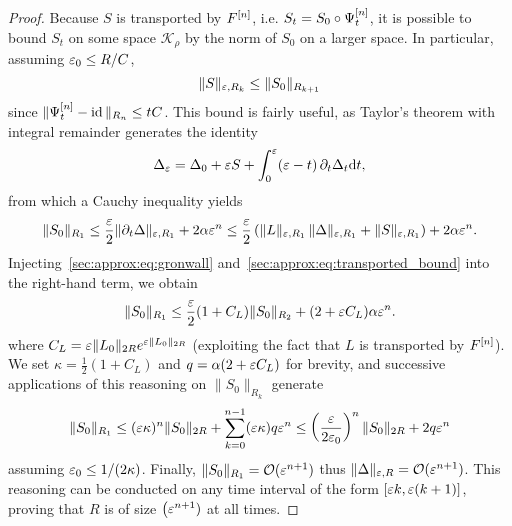 \begin{proof}
Because $S$ is transported by $F^{[n]}$, i.e. $S_t = S_0 \circ \Psi^{[n]}
_t$, it is possible to bound $S_t$ on some space $\mathcal{K}_\rho$ by the
norm of $S_0$ on a larger space. In particular, assuming $\varepsilon_0 \leq
R/C$, 
\begin{equation} \label{sec:approx:eq:transported_bound}
  \| S \|_{\varepsilon, R_k} \leq \| S_0 \| _{R_{k+1}}
\end{equation}
since $\| \Psi^{[n]} _t - \operatorname{id} \|_{R_n} \leq t C $. This bound is fairly
useful, as Taylor's theorem with integral remainder generates the identity
\begin{equation*} \label{sec:approx:eq:taylor}
  \Delta_{\varepsilon} = \Delta_0 + \varepsilon S 
    + \int_0^{\varepsilon} (\varepsilon - t) \, \partial_t \Delta _t \mathrm{d} t ,
\end{equation*}
from which a Cauchy inequality yields 
\begin{equation*}
  \| S_0 \|_{R_1} 
  \leq \frac{\varepsilon}{2} \| \partial_t \Delta \|_{\varepsilon, R_1} 
    + 2 \alpha \varepsilon^{n}
  \leq \frac{\varepsilon}{2} \left( \| L \|_{\varepsilon, R_1} \, \| \Delta \|_{\varepsilon, R_1} 
    + \| S \|_{\varepsilon, R_1} \right) + 2\alpha\varepsilon^{n} . 
\end{equation*}
Injecting~\eqref{sec:approx:eq:gronwall}
and~\eqref{sec:approx:eq:transported_bound} into the right-hand term, we
obtain 
\begin{equation*}
  \| S_0 \|_{R_1} 
  \leq \frac{\varepsilon}{2} (1 + C_L) \| S_0 \|_{R_2}
    + ( 2 + \varepsilon C_L ) \alpha \varepsilon^{n} .
\end{equation*} 
where $C_L = \varepsilon \| L_0 \|_{2R} e^{\varepsilon \| L_0 \|_{2R}}$ (exploiting the
fact that $L$ is transported by $F^{[n]}$). We set $\kappa = \frac{1}{2}( 1
+ C_L)$ and $q = \alpha (2 + \varepsilon C_L)$ for brevity, and successive
applications of this reasoning on $\| S_0 \|_{R_k}$ generate 
\begin{equation*}
  \| S_0 \| _{R_1} 
  \leq (\varepsilon \kappa)^n \| S_0 \|_{2R}
    + \sum_{k = 0}^{n-1} (\varepsilon \kappa) q \varepsilon^n
  \leq \left(\frac{\varepsilon}{2\varepsilon_0}\right)^n \| S_0 \|_{2R} 
    + 2q \varepsilon^n
\end{equation*}
assuming $\varepsilon_0 \leq 1/(2\kappa)$. Finally, $\| S_0 \|_{R_1} =
\mathcal{O}(\varepsilon^{n+1})$ thus $\| \Delta \|_{\varepsilon, R} = \mathcal{O}( \varepsilon^{n+1} )$.
This reasoning can be conducted on any time interval of the form $[\varepsilon k,
\varepsilon (k+1)]$, proving that $R$ is of size $\big( \varepsilon^{n+1})$ at all
times. 

\end{proof}